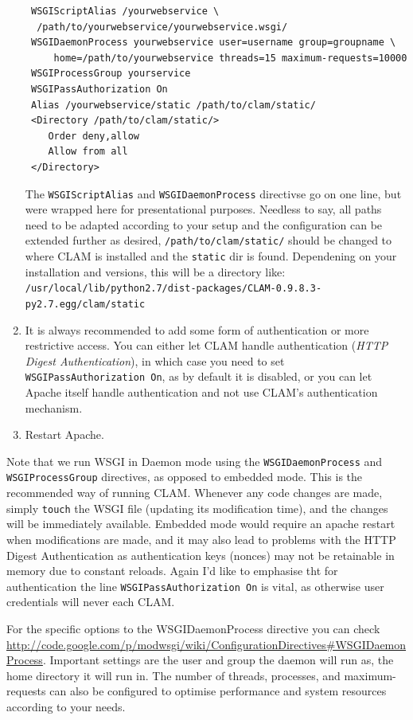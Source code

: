 \documentclass[a4paper,12pt]{report}
\begin{document}
\begin{enumerate}
\begin{verbatim}
 WSGIScriptAlias /yourwebservice \
  /path/to/yourwebservice/yourwebservice.wsgi/
 WSGIDaemonProcess yourwebservice user=username group=groupname \
     home=/path/to/yourwebservice threads=15 maximum-requests=10000
 WSGIProcessGroup yourservice
 WSGIPassAuthorization On
 Alias /yourwebservice/static /path/to/clam/static/ 
 <Directory /path/to/clam/static/>
    Order deny,allow
    Allow from all
 </Directory>
\end{verbatim}

The \texttt{WSGIScriptAlias} and \texttt{WSGIDaemonProcess} directivse go on
one line, but were wrapped here
for presentational purposes. Needless to say, all paths need to be adapted
according to your setup and the configuration can be extended further as
desired, \texttt{/path/to/clam/static/} should be changed to where CLAM is
installed and the \texttt{static} dir is found. Dependening on your
installation and versions, this will be a directory like: \\
\texttt{/usr/local/lib/python2.7/dist-packages/CLAM-0.9.8.3-py2.7.egg/clam/static}

\item It is always recommended to add some form of authentication or more restrictive
  access. You can either let CLAM handle authentication (\emph{HTTP Digest
  Authentication}), in which case you need to set \texttt{WSGIPassAuthorization
  On}, as by default it is disabled, or you can let Apache itself handle
  authentication and not use CLAM's authentication mechanism.  

\item Restart Apache. 
\end{enumerate}

Note that we run WSGI in Daemon mode using the \texttt{WSGIDaemonProcess} and
\texttt{WSGIProcessGroup} directives, as opposed to embedded mode. This is the
recommended way of running CLAM. Whenever any code changes are made, simply
\texttt{touch} the WSGI file (updating its modification time), and the changes
will be immediately available. Embedded mode would require an apache restart
when modifications are made, and it may also lead to problems with the HTTP
Digest Authentication as authentication keys (nonces) may not be retainable in
memory due to constant reloads. Again I'd like to emphasise tht for
authentication the line \texttt{WSGIPassAuthorization On} is vital, as
otherwise user credentials will never each CLAM.

For the specific options to the WSGIDaemonProcess directive you can check
\url{http://code.google.com/p/modwsgi/wiki/ConfigurationDirectives\#WSGIDaemonProcess}.
Important settings are the user and group the daemon will run as, the home
directory it will run in. The number of threads, processes, and
maximum-requests can also be configured to optimise performance and system
resources according to your needs.
\end{document}
